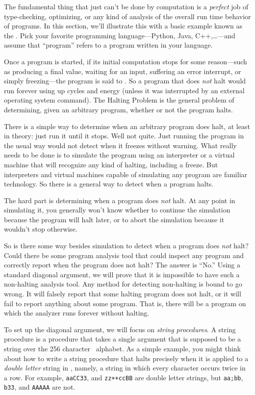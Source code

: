 The fundamental thing that just can't be done by computation is a
\emph{perfect} job of type-checking, optimizing, or any kind of
analysis of the overall run time behavior of programs.  In this
section, we'll illustrate this with a basic example known as the
.  Pick your favorite programming
language---Python, Java, C++,\dots---and assume that ``program''
refers to a program written in your language. 

Once a program is started, if its initial computation stops for some
reason---such as producing a final value, waiting for an input,
suffering an error interrupt, or simply freezing---the program is said
to .  So a program that does \emph{not} halt would run
forever using up cycles and energy (unless it was interrupted by an
external operating system command).  The Halting Problem is the
general problem of determining, given an arbitrary program, whether or
not the program halts.

There is a simple way to determine when an arbitrary program does
halt, at least in theory: just run it until it stops.  Well not quite.
Just running the program in the usual way would not detect when it
freezes without warning.  What really needs to be done is to simulate
the program using an interpreter or a virtual machine that will
recognize any kind of halting, including a freeze.  But interpreters
and virtual machines capable of simulating any program are familiar
technology.  So there is a general way to detect when a program halts.

The hard part is determining when a program does \emph{not} halt.  At
any point in simulating it, you generally won't know whether to
continue the simulation because the program will halt later, or to
abort the simulation because it wouldn't stop otherwise.

So is there some way besides simulation to detect when a program does
\emph{not} halt?  Could there be some program analysis tool that could
inspect any program and correctly report when the program does not
halt?  The answer is ``No.''  Using a standard diagonal argument, we
will prove that it is impossible to have such a non-halting analysis
tool.  Any method for detecting non-halting is bound to go wrong.  It
will falsely report that some halting program does not halt, or it
will fail to report anything about some program.  That is, there will
be a program on which the analyzer runs forever without halting.

To set up the diagonal argument, we will focus on \emph{string
  procedures}.  A string procedure is a procedure that takes a single
argument that is supposed to be a string over the 256 character
\asciibet\ alphabet.
As a simple example, you might think about how to write a string
procedure that halts precisely when it is applied to a \emph{double
  letter} string in \asciistr, namely, a string in which every
character occurs twice in a row.  For example, \texttt{aaCC33}, and
\texttt{zz++ccBB} are double letter strings, but \texttt{aa;bb},
\texttt{b33}, and \texttt{AAAAA} are not.

